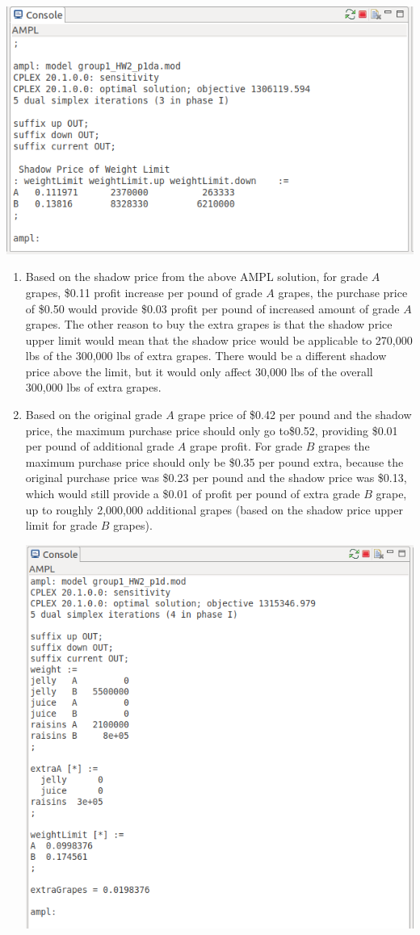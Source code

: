 \documentclass[11pt]{article}
\begin{document}
\begin{enumerate}
\begin{enumerate}
\includegraphics[width = .9\textwidth]{outputp1da.png}
\begin{enumerate}
\item Based on the shadow price from the above AMPL solution, for grade $A$ grapes, \$0.11 profit increase per pound of grade $A$ grapes, the purchase price of \$0.50 would provide \$0.03 profit per pound of increased amount of grade $A$ grapes.  The other reason to buy the extra grapes is that the shadow price upper limit would mean that the shadow price would be applicable to 270,000 lbs of the 300,000 lbs of extra grapes.  There would be a different shadow price above the limit, but it would only affect 30,000 lbs of the overall 300,000 lbs of extra grapes. 
\item Based on the original grade $A$ grape price of \$0.42 per pound and the shadow price, the maximum purchase price should only go to\$0.52, providing \$0.01 per pound of additional grade $A$ grape profit.  For grade $B$ grapes the maximum purchase price should only be \$0.35 per pound extra, because the original purchase price was \$0.23 per pound and the shadow price was \$0.13, which would still provide a \$0.01 of profit per pound of extra grade $B$ grape, up to roughly 2,000,000 additional grapes (based on the shadow price upper limit for grade $B$ grapes).

\includegraphics[width=.9\textwidth]{outputp1db.png}


\end{enumerate}
\end{enumerate}
\end{enumerate}
\end{document}
